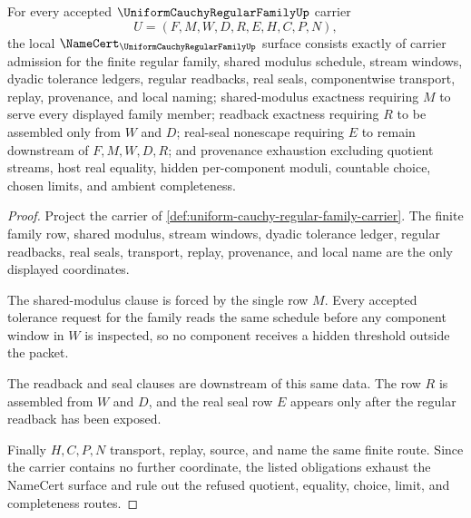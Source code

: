 \begin{theorem}
\label{thm:uniform-cauchy-regular-family-namecert-obligations}
For every accepted $\UniformCauchyRegularFamilyUp$ carrier
$$
U=(F,M,W,D,R,E,H,C,P,N),
$$
the local $\NameCert_{\UniformCauchyRegularFamilyUp}$ surface consists exactly of carrier admission for the finite regular family, shared modulus schedule, stream windows, dyadic tolerance ledgers, regular readbacks, real seals, componentwise transport, replay, provenance, and local naming; shared-modulus exactness requiring $M$ to serve every displayed family member; readback exactness requiring $R$ to be assembled only from $W$ and $D$; real-seal nonescape requiring $E$ to remain downstream of $F,M,W,D,R$; and provenance exhaustion excluding quotient streams, host real equality, hidden per-component moduli, countable choice, chosen limits, and ambient completeness.
\end{theorem}
\begin{proof}
Project the carrier of \autoref{def:uniform-cauchy-regular-family-carrier}. The finite family row, shared modulus, stream windows, dyadic tolerance ledger, regular readbacks, real seals, transport, replay, provenance, and local name are the only displayed coordinates.

The shared-modulus clause is forced by the single row $M$. Every accepted tolerance request for the family reads the same schedule before any component window in $W$ is inspected, so no component receives a hidden threshold outside the packet.

The readback and seal clauses are downstream of this same data. The row $R$ is assembled from $W$ and $D$, and the real seal row $E$ appears only after the regular readback has been exposed.

Finally $H,C,P,N$ transport, replay, source, and name the same finite route. Since the carrier contains no further coordinate, the listed obligations exhaust the NameCert surface and rule out the refused quotient, equality, choice, limit, and completeness routes.
\end{proof}

